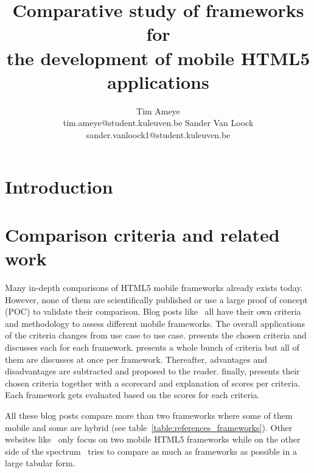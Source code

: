 \documentclass[a4paper]{artikel3}
\title{Comparative study of frameworks for \\ the development of mobile HTML5 applications}
\author{Tim Ameye \\ tim.ameye@student.kuleuven.be \And Sander Van Loock \\ sander.vanloock1@student.kuleuven.be}
\begin{document}
\maketitle

\begin{abstract}

\end{abstract}

\section{Introduction} %
\label{sec:introduction}

\section{Comparison criteria and related work}
\label{sec:comparisoncriteria}


Many in-depth comparisons of HTML5 mobile frameworks already exists today.  However, none of them are scientifically published or use a large proof of concept (POC) to validate their comparison.  Blog posts like~\cite{Sarrafi2012a,Ayuso2012,Rozynski2011} all have their own criteria and methodology to assess different mobile frameworks.  The overall applications of the criteria changes from use case to use case.  \cite{Rozynski2011} presents the chosen criteria and discusses each for each framework.  \cite{Ayuso2012} presents a whole bunch of criteria but all of them are discusses at once per framework.  Thereafter,  advantages and disadvantages are subtracted and proposed to the reader.  \cite{Sarrafi2012a} finally,  presents their chosen criteria together with a scorecard and explanation of scores per criteria.  Each framework gets evaluated based on the scores for each criteria.

All these blog posts compare more than two frameworks where some of them mobile and some are hybrid (see table~\ref{table:references_frameworks}).  Other websites like~\cite{Bristowe2012,Burris} only focus on two mobile HTML5 frameworks while on the other side of the spectrum~\cite{Falk2011} tries to compare as much as frameworks as possible in a large tabular form.


\end{document}
